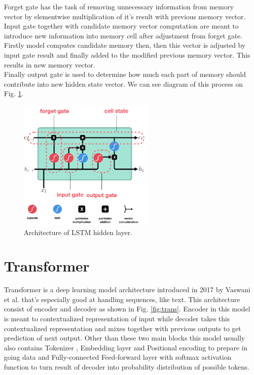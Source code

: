 Forget gate has the task of removing unnecessary information from memory vector by elementwise multiplication of it's result with previous memory vector. 
\\

Input gate together with candidate memory vector computation are meant to introduce new information into memory cell after adjustment from forget gate. Firstly model computes candidate memory then, then this vector is adjusted by input gate result and finally added to the modified previous memory vector. This results in new memory vector.
\\

Finally output gate is used to determine how much each part of memory should contribute into new hidden state vector. We can see diagram of this process on Fig. \ref{fig:lstm_arch}.

\begin{figure}[!h]
	\centering
	
	\includegraphics[width=0.6\textwidth]{images/LSTM_arch.png}
	
	\caption{Architecture of LSTM hidden layer.}
	\label{fig:lstm_arch}
\end{figure}

\section{Transformer}
\label{theoryTrans}

Transformer is a deep learning model architecture introduced in 2017 by Vaswani et al. \cite{attentionAllYouNeed} that's especially good at handling sequences, like text. This architecture consist of encoder and decoder as shown in Fig. \ref{fig:trans}. Encoder in this model is meant to contextualized representation of input while decoder takes this contextualized representation and mixes together with previous outputs to get prediction of next output. Other than these two main blocks this model usually also contains Tokenizer , Embedding layer and Positional encoding to prepare in going data and Fully-connected Feed-forward layer with softmax activation function to turn result of decoder into probability distribution of possible tokens.  

